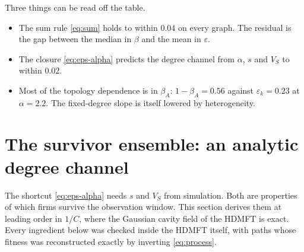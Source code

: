 \documentclass[11pt]{article}
\theoremstyle{remark}
\begin{document}
Three things can be read off the table.
\begin{itemize}
  \item The sum rule \eqref{eq:sum} holds to within $0.04$ on every graph.  The residual is
        the gap between the median in $\beta$ and the mean in $\varepsilon$.
  \item The closure \eqref{eq:eps-alpha} predicts the degree channel from $\alpha$, $s$ and
        $V_S$ to within $0.02$.
  \item Most of the topology dependence is in $\beta_A$: $1-\beta_A=0.56$ against
        $\varepsilon_k=0.23$ at $\alpha=2.2$.  The fixed-degree slope is itself lowered by
        heterogeneity.
\end{itemize}

\section{The survivor ensemble: an analytic degree channel}
\label{sec:ensemble}

The shortcut \eqref{eq:eps-alpha} needs $s$ and $V_S$ from simulation.  Both are properties of
which firms survive the observation window.  This section derives them at leading order in $1/C$,
where the Gaussian cavity field of the HDMFT is exact.  Every ingredient below was checked inside
the HDMFT itself, with paths whose fitness was reconstructed exactly by inverting
\eqref{eq:process}.
\end{document}
